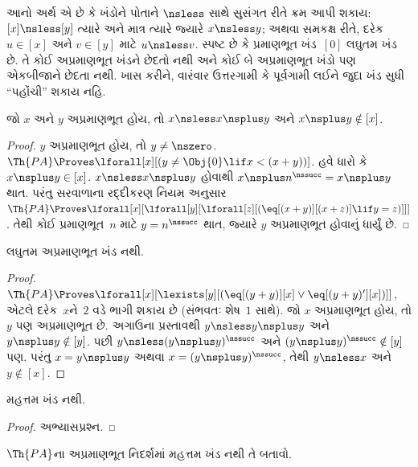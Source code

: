 \begin{explain}
આનો અર્થ એ છે કે ખંડોને પોતાને $\nsless$ સાથે સુસંગત રીતે ક્રમ આપી
શકાય: $[x]\nsless[y]$ ત્યારે અને માત્ર ત્યારે જ્યારે $x\nsless y$;
અથવા સમકક્ષ રીતે, દરેક $u\in[x]$ અને $v\in[y]$ માટે $u\nsless v$.
સ્પષ્ટ છે કે પ્રમાણભૂત ખંડ~$[0]$ લઘુતમ ખંડ છે. તે કોઈ અપ્રમાણભૂત
ખંડને છેદતો નથી અને કોઈ બે અપ્રમાણભૂત ખંડો પણ એકબીજાને છેદતા નથી.
ખાસ કરીને, વારંવાર ઉત્તરગામી કે પૂર્વગામી લઈને જુદા ખંડ સુધી
``પહોંચી'' શકાય નહિ.
\end{explain}

\begin{prop}
જો $x$ અને $y$ અપ્રમાણભૂત હોય, તો $x\nsless x\nsplus y$ અને
$x\nsplus y\notin[x]$.
\end{prop}

\begin{proof}
$y$ અપ્રમાણભૂત હોય, તો $y\neq\nszero$.
$\Th{PA}\Proves\lforall[x][(y\neq\Obj{0}\lif x<(x+y))]$. હવે ધારો
કે $x\nsplus y\in[x]$. $x\nsless x\nsplus y$ હોવાથી
$x\nsplus n^\nssucc=x\nsplus y$ થાત. પરંતુ સરવાળાના રદ્દીકરણ નિયમ અનુસાર
$\Th{PA}\Proves\lforall[x][\lforall[y][\lforall[z][(\eq[(x+y)][(x+z)]\lif y=z)]]]$.
તેથી કોઈ પ્રમાણભૂત~$n$ માટે $y=n^\nssucc$ થાત, જ્યારે
$y$ અપ્રમાણભૂત હોવાનું ધાર્યું છે.
\end{proof}

\begin{prop}
લઘુતમ અપ્રમાણભૂત ખંડ નથી.
\end{prop}

\begin{proof}
$\Th{PA}\Proves\lforall[x][\lexists[y][(\eq[(y+y)][x]\lor
\eq[(y+y)'][x])]]$, એટલે દરેક~$x$ને~$2$ વડે ભાગી શકાય છે (સંભવતઃ
શેષ~$1$ સાથે). જો $x$ અપ્રમાણભૂત હોય, તો $y$ પણ અપ્રમાણભૂત છે. અગાઉના
પ્રસ્તાવથી $y\nsless y\nsplus y$ અને $y\nsplus y\notin[y]$. પછી
$y\nsless(y\nsplus y)^\nssucc$ અને
$(y\nsplus y)^\nssucc\notin[y]$ પણ. પરંતુ
$x=y\nsplus y$ અથવા $x=(y\nsplus y)^\nssucc$, તેથી $y\nsless x$ અને
$y\notin[x]$.
\end{proof}

\begin{prop}
મહત્તમ ખંડ નથી.
\end{prop}

\begin{proof}
અભ્યાસપ્રશ્ન.
\end{proof}

\begin{prob}
$\Th{PA}$ના અપ્રમાણભૂત નિદર્શમાં મહત્તમ ખંડ નથી તે બતાવો.
\end{prob}

